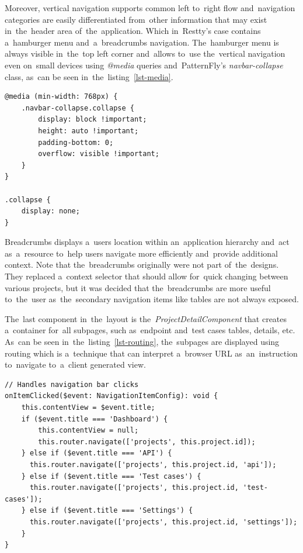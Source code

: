 Moreover, vertical navigation supports common left to~right flow
and~navigation categories are easily differentiated from~other information that may exist in~the~header area
of~the~application. Which in~Restty's case contains a~hamburger menu and~a~breadcrumbs navigation. 
The~hamburger menu is always visible in~the~top left corner and~allows to~use the~vertical navigation even
on~small devices using \textit{@media} queries and~PatternFly's \textit{navbar-collapse} class, as~can be seen in~the~listing~\ref{lst-media}.

\vspace{1mm}
\begin{lstlisting}[caption=Media queries on the \textit{.navbar-collapse} class that enables the~navigation bar
to~work even on~small devices., style=dp-default, label=lst-media]
@media (min-width: 768px) {
	.navbar-collapse.collapse {
		display: block !important;
		height: auto !important;
		padding-bottom: 0;
		overflow: visible !important;
	}
}

.collapse {
	display: none;
}
\end{lstlisting}

Breadcrumbs displays a~users location within an~application hierarchy and~act as~a~resource to~help users navigate more
efficiently and~provide additional context. Note that the~breadcrumbs originally were not part of~the~designs. They
replaced a~context selector that should allow for~quick changing between various projects, but it was decided that
the~breadcrumbs are more useful to~the~user as~the~secondary navigation items like tables are not always exposed.

The~last component in~the~layout is the~\textit{ProjectDetailComponent} that creates a~container for~all subpages,
such as~endpoint and~test cases tables, details, etc. As~can be seen in~the~listing~\ref{lst-routing}, the~subpages are displayed using routing which is a~technique
that can interpret a~browser URL as~an~instruction to~navigate to~a~client generated view.

\vspace{1mm}
\begin{lstlisting}[caption=Solution of~routing the~subpages in~the~\textit{ProjectDetailComponent}.,
style=dp-default, label=lst-routing]
// Handles navigation bar clicks
onItemClicked($event: NavigationItemConfig): void {
	this.contentView = $event.title;
	if ($event.title === 'Dashboard') {
		this.contentView = null;
		this.router.navigate(['projects', this.project.id]);
    } else if ($event.title === 'API') {
      this.router.navigate(['projects', this.project.id, 'api']);
    } else if ($event.title === 'Test cases') {
      this.router.navigate(['projects', this.project.id, 'test-cases']);
    } else if ($event.title === 'Settings') {
      this.router.navigate(['projects', this.project.id, 'settings']);
    }
}
\end{lstlisting}

